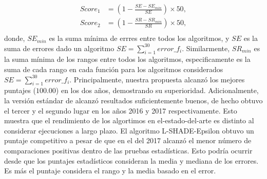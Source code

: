 %
\begin{equation}\label{eqn:total_scores}
\begin{split}
Score_1 &= \left (1 - \frac{SE - SE_{min}}{SE} \right) \times 50, \\
Score_2 &= \left  (1 - \frac{SR - SR_{min}}{SR} \right ) \times 50, \\
\end{split}
\end{equation}
donde, $SE_{min}$ es la suma mínima de errres entre todos los algoritmos, y $SE$ es la suma de errores dado un algoritmo $SE = \sum_{i=1}^{30} error\_f_i$.
%
Similarmente, $SR_{min}$ es la suma mínima de los rangos entre todos los algoritmos, especificamente es la suma de cada rango en cada función para los algoritmos considerados $SE = \sum_{i=1}^{30} error\_f_i$.
%
%
Principalmente, nuestra propuesta alcanzó los mejores puntajes ($100.00$) en los dos años, demostrando su superioridad. 
%
Adicionalmente, la versión estándar de \DE{} alcanzó resultados suficientemente buenos, de hecho obtuvo el tercer y el segundo lugar en los años 2016 y 2017 respectivamente.
%
Esto muestra que el rendimiento de los algortimos en el-estado-del-arte es distinto al considerar ejecuciones a largo plazo.
%
El algoritmo L-SHADE-Epsilon obtuvo un puntaje competitivo a pesar de que en el \CEC{} del 2017  alcanzó el menor número de comparaciones positivas dentro de las pruebas estadísticas.
%
Esto podría ocurrir desde que los puntajes estadísticos consideran la media y mediana de los errores.
%
Es más el puntaje considera el rango y la media basado en el error.
%


